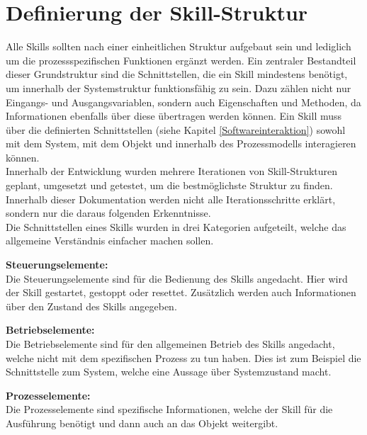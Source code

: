 \section{Definierung der Skill-Struktur} \label{Skillstruktur}
	Alle Skills sollten nach einer einheitlichen Struktur aufgebaut sein und lediglich um die prozessspezifischen Funktionen ergänzt werden. Ein zentraler Bestandteil dieser Grundstruktur sind die Schnittstellen, die ein Skill mindestens benötigt, um innerhalb der Systemstruktur funktionsfähig zu sein. Dazu zählen nicht nur Eingangs- und Ausgangsvariablen, sondern auch Eigenschaften und Methoden, da Informationen ebenfalls über diese übertragen werden können. Ein Skill muss über die definierten Schnittstellen (siehe Kapitel \ref{Softwareinteraktion}) sowohl mit dem System, mit dem Objekt und innerhalb des Prozessmodells interagieren können. 
	\\
	Innerhalb der Entwicklung wurden mehrere Iterationen von Skill-Strukturen geplant, umgesetzt und getestet, um die bestmöglichste Struktur zu finden. Innerhalb dieser Dokumentation werden nicht alle Iterationsschritte erklärt, sondern nur die daraus folgenden Erkenntnisse. 
	\\
	Die Schnittstellen eines Skills wurden in drei Kategorien aufgeteilt, welche das allgemeine Verständnis einfacher machen sollen.
	
	\textbf{Steuerungselemente:}
	\vspace{2mm} 
	\\
	Die Steuerungselemente sind für die Bedienung des Skills angedacht. Hier wird der Skill gestartet, gestoppt oder resettet. Zusätzlich werden auch Informationen über den Zustand des Skills angegeben.
	
	\textbf{Betriebselemente:}
	\vspace{2mm} 
	\\
	Die Betriebselemente sind für den allgemeinen Betrieb des Skills angedacht, welche nicht mit dem spezifischen Prozess zu tun haben. Dies ist zum Beispiel die Schnittstelle zum System, welche eine Aussage über Systemzustand macht. 
	
	\textbf{Prozesselemente:}
	\vspace{2mm} 
	\\
	Die Prozesselemente sind spezifische Informationen, welche der Skill für die Ausführung benötigt und dann auch an das Objekt weitergibt. 
	
